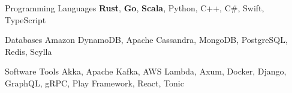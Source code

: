 

\begin{cvskills}

  \cvskill
    {Programming Languages} %
    {{\bf Rust}, {\bf Go}, {\bf Scala}, Python, C++, C\#, Swift, TypeScript} %

  \cvskill
    {Databases} %
    {Amazon DynamoDB, Apache Cassandra, MongoDB, PostgreSQL, Redis, Scylla} %

  \cvskill
    {Software Tools} %
    {Akka, Apache Kafka, AWS Lambda, Axum, Docker, Django, GraphQL, gRPC, Play Framework, React, Tonic} %

\end{cvskills}
